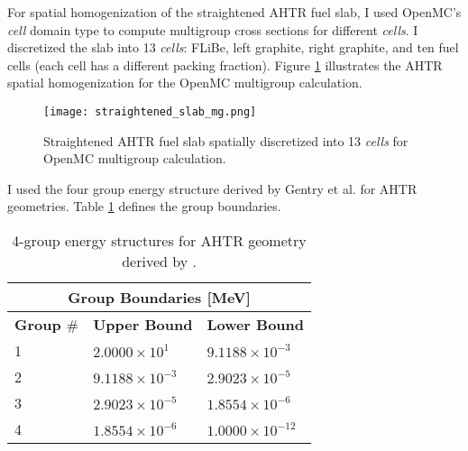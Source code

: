 For spatial homogenization of the straightened \gls{AHTR} fuel slab, I used 
OpenMC's \textit{cell} domain type to compute multigroup cross sections for 
different \textit{cells}. 
I discretized the slab into 13 \textit{cells}: FLiBe, left graphite, right 
graphite, and ten fuel cells (each cell has a different packing fraction). 
Figure \ref{fig:straightened_slab_mg} illustrates the \gls{AHTR} spatial 
homogenization for the OpenMC multigroup calculation. 
\begin{figure}[H]
    \centering
    \texttt{[image: straightened\_slab\_mg.png]}
    \raggedright
    \caption{Straightened \acrfull{AHTR} fuel slab spatially discretized into 
    13 \textit{cells} for OpenMC multigroup calculation.}
    \label{fig:straightened_slab_mg}
\end{figure}
I used the four group energy structure derived by Gentry et al. 
\cite{gentry_development_2016} for \gls{AHTR} geometries. 
Table \ref{tab:energy_structures} defines the group boundaries. 
\begin{table}[H]
    \centering
    \onehalfspacing
    \caption{4-group energy structures for \acrfull{AHTR} geometry 
    derived by \cite{gentry_development_2016}.}
	\label{tab:energy_structures}
    \footnotesize
    \begin{tabular}{lll}
    \hline
    \multicolumn{3}{c}{\textbf{Group Boundaries [MeV]}} \\ 
    \hline
    \textbf{Group $\#$}& \textbf{Upper Bound} & \textbf{Lower Bound}  \\
    \hline 
    1 & $2.0000\times 10^1$ & $9.1188\times 10^{-3}$ \\ 
    2 & $9.1188\times 10^{-3}$ & $2.9023\times 10^{-5}$\\
    3 & $2.9023\times 10^{-5}$ & $1.8554\times 10^{-6}$\\
    4 & $1.8554\times 10^{-6}$ & $1.0000\times 10^{-12}$\\
    \hline
    \end{tabular}
\end{table}

